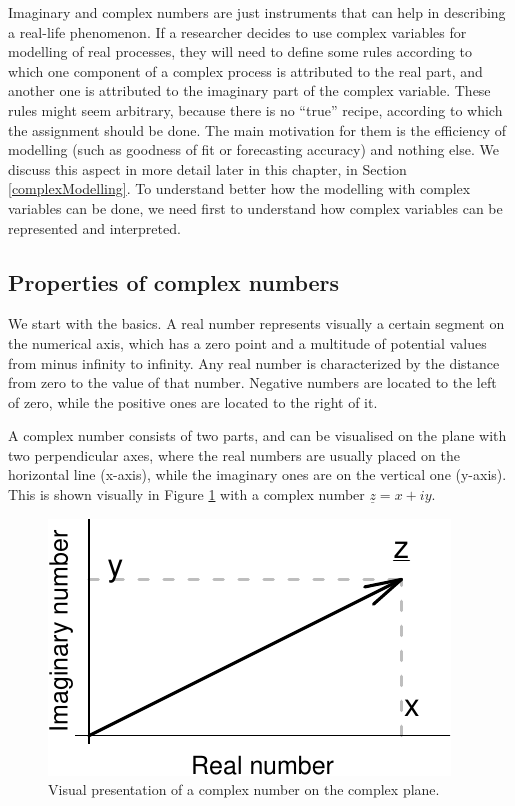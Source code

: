 \documentclass[
]{book}
\begin{document}
Imaginary and complex numbers are just instruments that can help in describing a real-life phenomenon. If a researcher decides to use complex variables for modelling of real processes, they will need to define some rules according to which one component of a complex process is attributed to the real part, and another one is attributed to the imaginary part of the complex variable. These rules might seem arbitrary, because there is no ``true'' recipe, according to which the assignment should be done. The main motivation for them is the efficiency of modelling (such as goodness of fit or forecasting accuracy) and nothing else. We discuss this aspect in more detail later in this chapter, in Section \ref{complexModelling}. To understand better how the modelling with complex variables can be done, we need first to understand how complex variables can be represented and interpreted.

\hypertarget{properties-of-complex-numbers}{%
\subsection{Properties of complex numbers}\label{properties-of-complex-numbers}}

We start with the basics. A real number represents visually a certain segment on the numerical axis, which has a zero point and a multitude of potential values from minus infinity to infinity. Any real number is characterized by the distance from zero to the value of that number. Negative numbers are located to the left of zero, while the positive ones are located to the right of it.

A complex number consists of two parts, and can be visualised on the plane with two perpendicular axes, where the real numbers are usually placed on the horizontal line (x-axis), while the imaginary ones are on the vertical one (y-axis). This is shown visually in Figure \ref{fig:complexPlane} with a complex number \(\underline{z}=x+iy\).

\begin{figure}
\centering
\includegraphics{Svetunkov---Svetunkov---Complex-Valued-Econometrics_files/figure-latex/complexPlane-1.pdf}
\caption{\label{fig:complexPlane}Visual presentation of a complex number on the complex plane.}
\end{figure}
\end{document}
